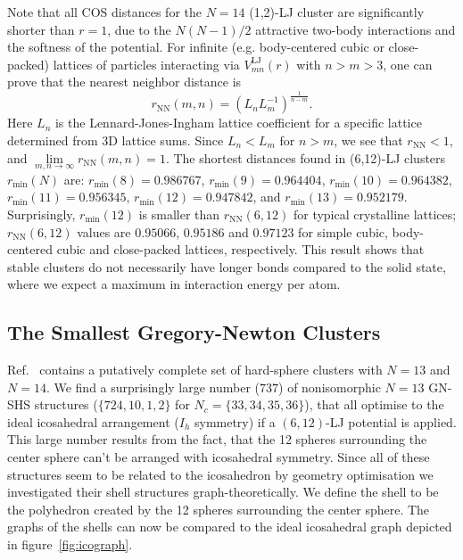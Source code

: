 Note that all \ac{COS} distances for the $N=14$ (1,2)-\ac{LJ} cluster are
significantly shorter than $r=1$, due to the $N(N-1)/2$ attractive two-body
interactions and the softness of the potential.  For infinite (e.g.
body-centered cubic or close-packed) lattices of particles interacting via
$V^\mathrm{LJ}_{mn}(r)$ with $n> m >3$, one can prove
\autocite{Schwerdtfeger_ExtensionLennardJonespotential_2006} that the nearest neighbor distance is
%
\begin{equation}
    r_\mathrm{NN}(m,n)=\left( L_n L_m^{-1}\right)^\frac{1}{n-m}. %
    \label{eqn:lattice}
\end{equation}%
%
Here $L_n$ is the Lennard-Jones-Ingham lattice coefficient for a specific
lattice determined from 3D lattice sums.  Since $L_n<L_m$ for $n>m$, we see
that $r_\mathrm{NN}<1$, and $\lim\limits_{m,n\rightarrow
\infty}r_\mathrm{NN}(m,n)=1$.  The shortest distances found in (6,12)-\ac{LJ}
clusters $r_\text{min}(N)$ are: $r_\text{min}(8)=0.986767$,
$r_\text{min}(9)=0.964404$, $r_\text{min}(10)=0.964382$,
$r_\text{min}(11)=0.956345$, $r_\text{min}(12)=0.947842$, and
$r_\text{min}(13)=0.952179$.  Surprisingly, $r_\text{min}(12)$ is smaller than
$r_\mathrm{NN}(6,12)$ for typical crystalline lattices; $r_\mathrm{NN}(6,12)$
values are $0.95066$, $0.95186$ and $0.97123$ for simple cubic, body-centered
cubic and close-packed lattices, respectively.  This result shows that stable
clusters do not necessarily have longer bonds compared to the solid state,
where we expect a maximum in interaction energy per atom.


\subsection{The Smallest Gregory-Newton Clusters}
\label{sec:themsmallestgregorynewtonclusters}

Ref.~\cite{Holmes-Cerfon_EnumeratingRigidSphere_2016} contains a putatively
complete set of hard-sphere clusters with $N=13$ and $N=14$.  We find a
surprisingly large number ($737$) of nonisomorphic $N = 13$ \ac{GN}-\ac{SHS}
structures ($\{724,10,1,2\}$ for $N_c=\{33,34,35,36\}$), that all optimise to
the ideal icosahedral arrangement ($I_h$ symmetry) if a $(6,12)$-\ac{LJ}
potential is applied. This large number results from the fact, that the 12
spheres surrounding the center sphere can't be arranged with icosahedral
symmetry. Since all of these structures seem to be related to the icosahedron
by geometry optimisation we investigated their shell structures
graph-theoretically. We define the shell to be the polyhedron created by the 12
spheres surrounding the center sphere. The graphs of the shells can now be
compared to the ideal icosahedral graph depicted in figure~\ref{fig:icograph}.

